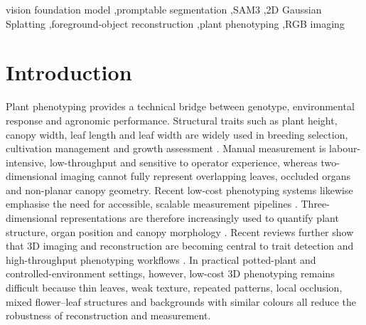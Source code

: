\documentclass[a4paper]{cas-sc}
\begin{document}
\begin{keywords}
vision foundation model \sep promptable segmentation \sep SAM3 \sep 2D Gaussian Splatting \sep foreground-object reconstruction \sep plant phenotyping \sep RGB imaging
\end{keywords}

\maketitle

\section{Introduction}\label{sec:introduction}

Plant phenotyping provides a technical bridge between genotype, environmental response and agronomic performance. Structural traits such as plant height, canopy width, leaf length and leaf width are widely used in breeding selection, cultivation management and growth assessment \cite{ref6,ref56,ref61}. Manual measurement is labour-intensive, low-throughput and sensitive to operator experience, whereas two-dimensional imaging cannot fully represent overlapping leaves, occluded organs and non-planar canopy geometry. Recent low-cost phenotyping systems likewise emphasise the need for accessible, scalable measurement pipelines \cite{ref62,ref63}. Three-dimensional representations are therefore increasingly used to quantify plant structure, organ position and canopy morphology \cite{ref8,ref10}. Recent reviews further show that 3D imaging and reconstruction are becoming central to trait detection and high-throughput phenotyping workflows \cite{ref9,ref11,ref12}. In practical potted-plant and controlled-environment settings, however, low-cost 3D phenotyping remains difficult because thin leaves, weak texture, repeated patterns, local occlusion, mixed flower--leaf structures and backgrounds with similar colours all reduce the robustness of reconstruction and measurement.
\end{document}
